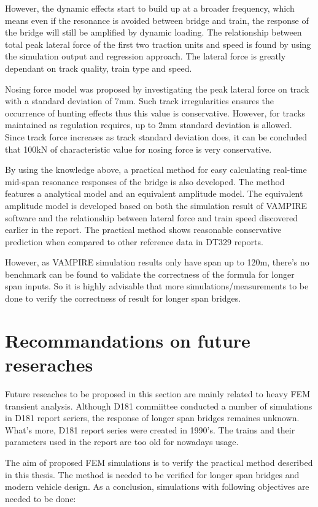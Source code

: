 However, the dynamic effects start to build up at a broader frequency, which means even if the resonance is avoided between bridge and train, the response of the bridge will still be amplified by dynamic loading. The relationship between total peak lateral force of the first two traction units and speed is found by using the simulation output and regression approach. The lateral force is greatly dependant on track quality, train type and speed.

Nosing force model was proposed by investigating the peak lateral force on track with a standard deviation of 7mm. Such track irregularities ensures the occurrence of hunting effects thus this value is conservative. However, for tracks maintained as regulation requires, up to 2mm standard deviation is allowed. Since track force increases as track standard deviation does, it can be concluded that 100kN of characteristic value for nosing force is very conservative.

By using the knowledge above, a practical method for easy calculating real-time mid-span resonance responses of the bridge is also developed. The method features a analytical model and an equivalent amplitude model. The equivalent amplitude model is developed based on both the simulation result of VAMPIRE software and the relationship between lateral force and train speed discovered earlier in the report. The practical method shows reasonable conservative prediction when compared to other reference data in DT329 reports.

However, as VAMPIRE simulation results only have span up to 120m, there’s no benchmark can be found to validate the correctness of the formula for longer span inputs. So it is highly advisable that more simulations/measurements to be done to verify the correctness of result for longer span bridges.

\chapter{Recommandations on future reseraches}

Future reseaches to be proposed in this section are mainly related to heavy FEM transient analysis. Although D181 commiittee conducted a number of simulations in D181 report seriers, the response of longer span bridges remaines unknown. What's more, D181 report series were created in 1990's. The trains and their parameters used in the report are too old for nowadays usage.

The aim of proposed FEM simulations is to verify the practical method described in this thesis. The method is needed to be verified for longer span bridges and modern vehicle design. As a conclusion, simulations with following objectives are needed to be done:

